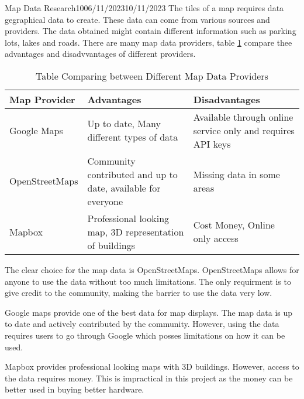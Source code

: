 \documentclass[12pt]{article}
\begin{document}
\begin{logbook-entry}{Map Data Research}{10}{06/11/2023}{10/11/2023}
The tiles of a map requires data gegraphical data to create.
These data can come from various sources and providers.
The data obtained might contain different information such as parking lots, lakes and roads.
There are many map data providers, table \ref{tab:map-providers} compare thee advantages and disadvvantages of different providers.

\begin{table}[H]
    \caption{Table Comparing between Different Map Data Providers}
    \label{tab:map-providers}
    \begin{tabularx}{\textwidth}{l X X}
        \hline
        Map Provider & Advantages & Disadvantages\\
        \hline
        Google Maps & Up to date, Many different types of data & Available through online service only and requires API keys\\
        OpenStreetMaps & Community contributed and up to date, available for everyone & Missing data in some areas\\
        Mapbox & Professional looking map, 3D representation of buildings & Cost Money, Online only access\\
        \hline
    \end{tabularx}
\end{table}

The clear choice for the map data is OpenStreetMaps.
OpenStreetMaps allows for anyone to use the data without too much limitations.
The only requirment is to give credit to the community, making the barrier to use the data very low.

Google maps provide one of the best data for map displays.
The map data is up to date and actively contributed by the community.
However, using the data requires users to go through Google which posses limitations on how it can be used.

Mapbox provides professional looking maps with 3D buildings.
However, access to the data requires money.
This is impractical in this project as the money can be better used in buying better hardware.
\end{logbook-entry}
\end{document}
